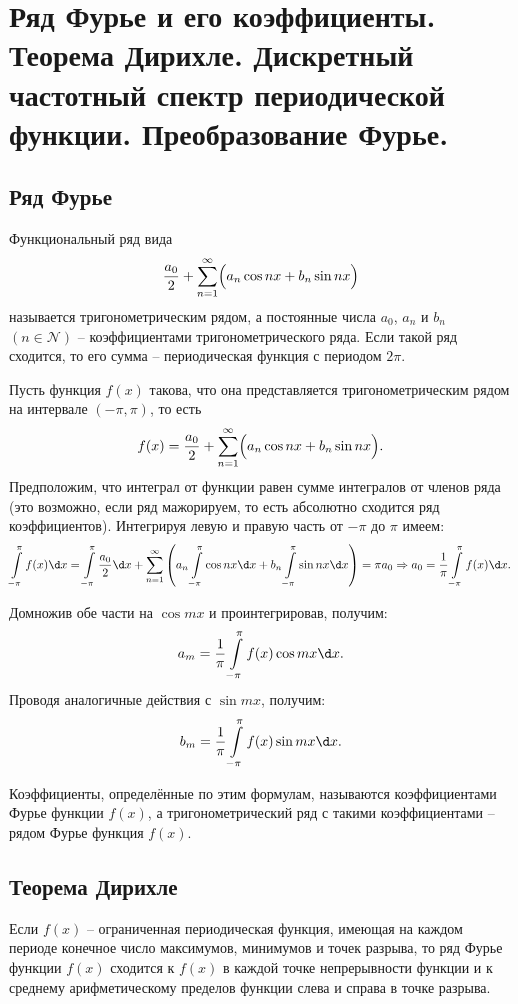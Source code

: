 \chapter{Ряд Фурье и его коэффициенты. Теорема Дирихле. Дискретный частотный
спектр периодической функции. Преобразование Фурье.}

\section{Ряд Фурье}
Функциональный ряд вида
\[
    \frac{a_0}{2} + \sum\limits_{n=1}^\infty \Bigl(a_n\cos nx + b_n\sin nx\Bigr)
\]
называется тригонометрическим рядом, а постоянные числа \( a_0 \), \( a_n \) и
\( b_n \) \( (n \in \mathcal{N}) \) -- коэффициентами тригонометрического ряда.
Если такой ряд сходится, то его сумма -- периодическая функция с периодом
\( 2\pi \).

Пусть функция \( f(x) \) такова, что она представляется тригонометрическим рядом
на интервале \( (-\pi, \pi) \), то есть
\[
    f(x) = \frac{a_0}{2} + \sum\limits_{n=1}^\infty \Bigl(a_n\cos nx +
    b_n\sin nx\Bigr).
\]
Предположим, что интеграл от функции равен сумме интегралов от членов ряда
(это возможно, если ряд мажорируем, то есть абсолютно сходится ряд
коэффициентов). Интегрируя левую и правую часть от \( -\pi \) до \( \pi \)
имеем:
\[
    \int\limits_{-\pi}^\pi f(x)\d x = \int\limits_{-\pi}^\pi \frac{a_0}{2}\d x +
    \sum\limits_{n=1}^\infty \left(a_n\int\limits_{-\pi}^\pi \cos nx\d x + b_n
    \int\limits_{-\pi}^\pi \sin nx\d x\right) = \pi a_0 \Rightarrow
    a_0 = \frac{1}{\pi}\int\limits_{-\pi}^\pi f(x) \d x.
\]

Домножив обе части на \( \cos mx \) и проинтегрировав, получим:
\[
    a_m = \frac{1}{\pi} \int\limits_{-\pi}^\pi f(x)\cos mx\d x.
\]
Проводя аналогичные действия с \( \sin mx \), получим:
\[
    b_m = \frac{1}{\pi} \int\limits_{-\pi}^\pi f(x)\sin mx \d x.
\]

Коэффициенты, определённые по этим формулам, называются коэффициентами Фурье
функции \( f(x) \), а тригонометрический ряд с такими коэффициентами -- рядом
Фурье функция \( f(x) \).

\section{Теорема Дирихле}
Если \( f(x) \) -- ограниченная периодическая функция, имеющая на каждом периоде
конечное число максимумов, минимумов и точек разрыва, то ряд Фурье функции
\( f(x) \) сходится к \( f(x) \) в каждой точке непрерывности функции и к
среднему арифметическому пределов функции слева и справа в точке разрыва.

